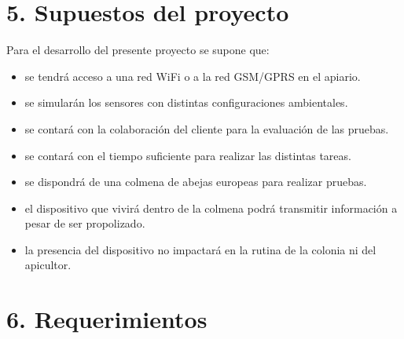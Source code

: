 \documentclass[
11pt, %
codirector, %
]{charter}
\begin{document}
\section{5. Supuestos del proyecto}
\label{sec:supuestos}

Para el desarrollo del presente proyecto se supone que:

\begin{itemize}
\item se tendrá acceso a una red WiFi o a la red GSM/GPRS en el apiario.
\item se simularán los sensores con distintas configuraciones ambientales.
\item se contará con la colaboración del cliente para la evaluación de las pruebas.
\item se contará con el tiempo suficiente para realizar las distintas tareas.
\item se dispondrá de una colmena de abejas europeas para realizar pruebas.
\item el dispositivo que vivirá dentro de la colmena podrá transmitir información a pesar de ser propolizado.
\item la presencia del dispositivo no impactará en la rutina de la colonia ni del apicultor.
\end{itemize}

\section{6. Requerimientos}
\label{sec:requerimientos}

\end{document}
